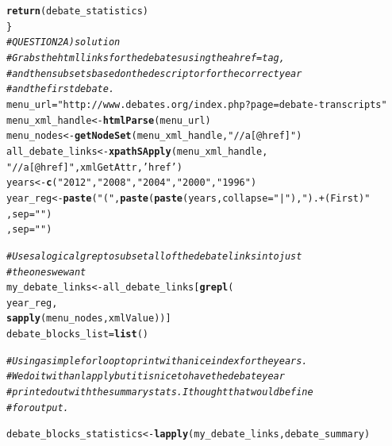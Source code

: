 \documentclass{article}\usepackage[]{graphicx}\usepackage[]{color}
\makeatletter
\newcommand{\hlstr}[1]{\textcolor[rgb]{0.192,0.494,0.8}{#1}}%
\newcommand{\hlcom}[1]{\textcolor[rgb]{0.678,0.584,0.686}{\textit{#1}}}%
\newcommand{\hlstd}[1]{\textcolor[rgb]{0.345,0.345,0.345}{#1}}%
\newcommand{\hlkwb}[1]{\textcolor[rgb]{0.69,0.353,0.396}{#1}}%
\newcommand{\hlkwc}[1]{\textcolor[rgb]{0.333,0.667,0.333}{#1}}%
\newcommand{\hlkwd}[1]{\textcolor[rgb]{0.737,0.353,0.396}{\textbf{#1}}}%
\newenvironment{kframe}{%
 \def\at@end@of@kframe{}%
 \ifinner\ifhmode%
  \def\at@end@of@kframe{\end{minipage}}%
  \begin{minipage}{\columnwidth}%
 \fi\fi%
 \def\FrameCommand##1{\hskip\@totalleftmargin \hskip-\fboxsep
 \colorbox{shadecolor}{##1}\hskip-\fboxsep
     \hskip-\linewidth \hskip-\@totalleftmargin \hskip\columnwidth}%
 \MakeFramed {\advance\hsize-\width
   \@totalleftmargin\z@ \linewidth\hsize
   \@setminipage}}%
 {\par\unskip\endMakeFramed%
 \at@end@of@kframe}
\newenvironment{knitrout}{}{} %
\makeatother
\begin{document}
\begin{knitrout}
\begin{kframe}
\begin{alltt}
  \hlkwd{return}\hlstd{(debate_statistics)}
\hlstd{\}}
\hlcom{# QUESTION 2A) solution}
\hlcom{# Grabs the html links for the debates using the a href= tag,}
\hlcom{# and then subsets based on the descriptor for the correct year}
\hlcom{# and the first debate.}
\hlstd{menu_url}\hlkwb{=}\hlstr{"http://www.debates.org/index.php?page=debate-transcripts"}
\hlstd{menu_xml_handle} \hlkwb{<-} \hlkwd{htmlParse}\hlstd{(menu_url)}
\hlstd{menu_nodes} \hlkwb{<-} \hlkwd{getNodeSet}\hlstd{(menu_xml_handle,}\hlstr{"//a[@href]"}\hlstd{)}
\hlstd{all_debate_links} \hlkwb{<-} \hlkwd{xpathSApply}\hlstd{(menu_xml_handle,}
                                \hlstr{"//a[@href]"}\hlstd{, xmlGetAttr,} \hlstr{'href'}\hlstd{)}
\hlstd{years} \hlkwb{<-} \hlkwd{c}\hlstd{(}\hlstr{"2012"}\hlstd{,}\hlstr{"2008"}\hlstd{,}\hlstr{"2004"}\hlstd{,}\hlstr{"2000"}\hlstd{,}\hlstr{"1996"}\hlstd{)}
\hlstd{year_reg} \hlkwb{<-} \hlkwd{paste}\hlstd{(}\hlstr{"("}\hlstd{,}\hlkwd{paste}\hlstd{(}\hlkwd{paste}\hlstd{(years,}\hlkwc{collapse}\hlstd{=}\hlstr{"|"}\hlstd{),}\hlstr{").+(First)"}
                            \hlstd{,}\hlkwc{sep}\hlstd{=}\hlstr{""}\hlstd{)}
                  \hlstd{,}\hlkwc{sep}\hlstd{=}\hlstr{""}\hlstd{)}

\hlcom{# Uses a logical grep to subset all of the debate links into just}
\hlcom{# the ones we want}
\hlstd{my_debate_links} \hlkwb{<-} \hlstd{all_debate_links[}\hlkwd{grepl}\hlstd{(}
  \hlstd{year_reg,}
  \hlkwd{sapply}\hlstd{(menu_nodes,xmlValue))]}
\hlstd{debate_blocks_list} \hlkwb{=} \hlkwd{list}\hlstd{()}

\hlcom{# Using a simple for loop to print with a nice index for the years.}
\hlcom{# We do it with an lapply but it is nice to have the debate year}
\hlcom{# printed out with the summary stats.  I thought that would be fine }
\hlcom{# for output.}

\hlstd{debate_blocks_statistics} \hlkwb{<-} \hlkwd{lapply}\hlstd{(my_debate_links,debate_summary)}
\end{alltt}


{\ttfamily\noindent\color{warningcolor}{\#\# Warning: closing unused connection 5 (http://www.debates.org/index.php?page=october-3-2012-debate-transcript)}}

{\ttfamily\noindent\color{warningcolor}{\#\# Warning: closing unused connection 5 (http://www.debates.org/index.php?page=2008-debate-transcript)}}

{\ttfamily\noindent\color{warningcolor}{\#\# Warning: closing unused connection 5 (http://www.debates.org/index.php?page=september-30-2004-debate-transcript)}}


\end{kframe}
\end{knitrout}
\end{document}
